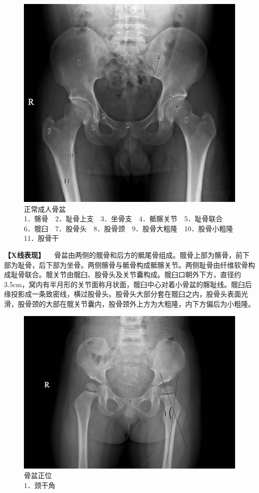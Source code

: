 \begin{figure}[!htbp]
 \centering
 \includegraphics{./images/Image00006.jpg}
 \captionsetup{justification=centering}
 \caption{正常成人骨盆\\{\small 1．髂骨　2．耻骨上支　3．坐骨支　4．骶髂关节　5．耻骨联合　6．髋臼　7．股骨头　8．股骨颈　9．股骨大粗隆　10．股骨小粗隆　11．股骨干}}
 \label{fig2-1-4}
  \end{figure} 

\textbf{【X线表现】}
　骨盆由两侧的髋骨和后方的骶尾骨组成。髋骨上部为髂骨，前下部为耻骨，后下部为坐骨。两侧髂骨与骶骨构成骶髂关节。两侧耻骨由纤维软骨构成耻骨联合。髋关节由髋臼、股骨头及关节囊构成。髋臼口朝外下方，直径约3.5cm，窝内有半月形的关节面称月状面，髋臼中心对着小骨盆的髂耻线。髋臼后缘投影成一条致密线，横过股骨头。股骨头大部分套在髋臼之内，股骨头表面光滑，股骨颈的大部在髋关节囊内，股骨颈外上方为大粗隆，内下方偏后为小粗隆。

\begin{figure}[!htbp]
 \centering
 \includegraphics{./images/Image00007.jpg}
 \captionsetup{justification=centering}
 \caption{骨盆正位\\{\small 1．颈干角}}
 \label{fig2-1-5}
  \end{figure} 

